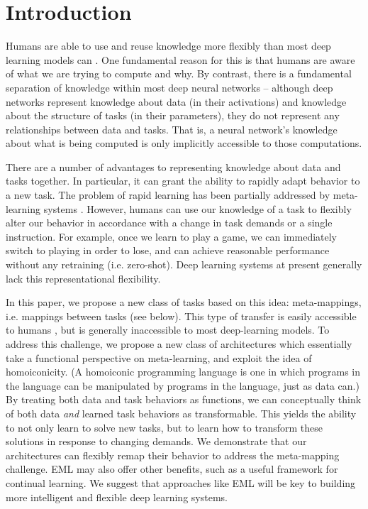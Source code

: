 \documentclass{article}
\begin{document}
\section{Introduction}
\vspace{-0.5em} %
Humans are able to use and reuse knowledge more flexibly than most deep learning models can \citep[e.g.][]{Lake2016, Marcus2018}. One fundamental reason for this is that humans are aware of what we are trying to compute and why. By contrast, there is a fundamental separation of knowledge within most deep neural networks -- although deep networks represent knowledge about data (in their activations) and knowledge about the structure of tasks (in their parameters), they do not represent any relationships between data and tasks. That is, a neural network's knowledge about what is being computed is only implicitly accessible to those computations. \par
There are a number of advantages to representing knowledge about data and tasks together. In particular, it can grant the ability to rapidly adapt behavior to a new task. The problem of rapid learning has been partially addressed by meta-learning systems \citep[e.g.][]{Santoro2016, Finn2017a, Finn2018, Stadie2018}. However, humans can use our knowledge of a task to flexibly alter our behavior in accordance with a change in task demands or a single instruction. For example, once we learn to play a game, we can immediately switch to playing in order to lose, and can achieve reasonable performance without any retraining (i.e. zero-shot). Deep learning systems at present generally lack this representational flexibility. \par
In this paper, we propose a new class of tasks based on this idea: meta-mappings, i.e. mappings between tasks (see below). This type of transfer is easily accessible to humans \citep{Lake2016}, but is generally inaccessible to most deep-learning models. To address this challenge, we propose a new class of architectures which essentially take a functional perspective on meta-learning, and exploit the idea of homoiconicity. (A homoiconic programming language is one in which programs in the language can be manipulated by programs in the language, just as data can.) By treating both data and task behaviors as functions, we can conceptually think of both data \emph{and} learned task behaviors as transformable. This yields the ability to not only learn to solve new tasks, but to learn how to transform these solutions in response to changing demands. We demonstrate that our architectures can flexibly remap their behavior to address the meta-mapping challenge. EML may also offer other benefits, such as a useful framework for continual learning. We suggest that approaches like EML will be key to building more intelligent and flexible deep learning systems. \par
\end{document}
